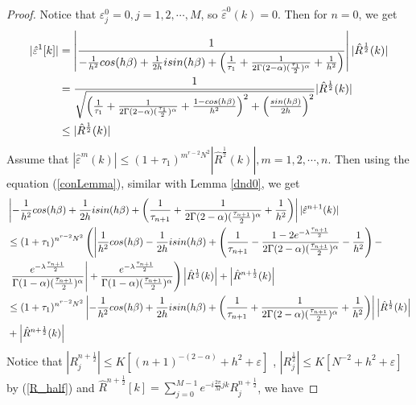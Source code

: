 \documentclass[10pt, reqno]{amsart}
\theoremstyle{remark}
\theoremstyle{definition}
\numberwithin{table}{section}
\begin{document}
\begin{proof}
    Notice that $\varepsilon^0_j=0, j=1, 2, \cdots, M$, so $\hat{\varepsilon}^0(k)=0$. Then for $n=0$, we get 
    \begin{align}
    |\hat{\varepsilon}^{1}[k]|&= \left|\frac{1}{-\frac{1}{h^2}cos(h\beta)+\frac{1}{2h}isin(h\beta)+\left(\frac{1}{\tau_{1}}+\frac{1}{2\Gamma(2-\alpha)(\frac{\tau_{1}}{2})^\alpha}+\frac{1}{h^2}\right)}\right||\hat{R}^{\frac{1}{2}}(k)|\notag\\
    &=\frac{1}{\sqrt{\left( \frac{1}{\tau_1}+\frac{1}{2\Gamma(2-\alpha)(\frac{\tau_{1}}{2})^\alpha}+\frac{1-cos(h\beta)}{h^2}\right)^2+\left(\frac{sin(h\beta)}{2h}\right)^2}}|\hat{R}^{\frac{1}{2}}(k)|\notag\\
    &\leq |\hat{R}^{\frac{1}{2}}(k)|\notag
\end{align}
Assume that $|\hat{\varepsilon}^m(k)|\leq (1+\tau_1)^{m^{r-2}N^{2}}|\hat{R}^{\frac{1}{2}}(k)|, m=1, 2, \cdots, n$. Then using the equation (\ref{conLemma}), similar with Lemma \ref{dnd0}, we get
\begin{align}
    &\left|-\frac{1}{h^2}cos(h\beta)+\frac{1}{2h}isin(h\beta)+\left(\frac{1}{\tau_{n+1}}+\frac{1}{2\Gamma(2-\alpha)(\frac{\tau_{n+1}}{2})^\alpha}+\frac{1}{h^2}\right) \right||\hat{\varepsilon}^{n+1}(k)|\notag \\
    &\leq (1+\tau_1)^{n^{r-2}N^{2}}\left(\left|\frac{1}{h^2}cos(h\beta)-\frac{1}{2h}isin(h\beta)+\left(\frac{1}{\tau_{n+1}}-\frac{1-2e^{-\lambda \frac{\tau_{n+1}}{2}}}{2\Gamma(2-\alpha)(\frac{\tau_{n+1}}{2})^\alpha}-\frac{1}{h^2}\right) -\right. \right. \notag\\
    &\left. \left. \frac{e^{-\lambda \frac{\tau_{n+1}}{2}}}{\Gamma(1-\alpha)(\frac{\tau_{n+1}}{2})^\alpha}\right|+\frac{e^{-\lambda \frac{\tau_{n+1}}{2}}}{\Gamma(1-\alpha)(\frac{\tau_{n+1}}{2})^\alpha}\right) \left|\hat{R}^{\frac{1}{2}}(k)\right|+\left|\hat{R}^{n+\frac{1}{2}}(k)\right| \notag\\
    &\leq (1+\tau_1)^{n^{r-2}N^{2}}\left|-\frac{1}{h^2}cos(h\beta)+\frac{1}{2h}isin(h\beta)+\left(\frac{1}{\tau_{n+1}}+\frac{1}{2\Gamma(2-\alpha)(\frac{\tau_{n+1}}{2})^\alpha}+\frac{1}{h^2}\right) \right|\left|\hat{R}^{\frac{1}{2}}(k)\right|\notag\\
    &+\left|\hat{R}^{n+\frac{1}{2}}(k)\right| \label{xi}
\end{align}
Notice that $\left|R_j^{n+\frac{1}{2}}\right| \leq K[(n+1)^{-(2-\alpha)}+h^2+\varepsilon]$ ,  $\left|R_j^{\frac{1}{2}}\right| \leq K[N^{-2}+h^2+\varepsilon]$ by (\ref{R_half}) and $\hat{R}^{n+\frac{1}{2}}[k]=\sum_{j=0}^{M-1} e^{-i \frac{2 \pi}{M} j k} R^{n+\frac{1}{2}}_j $, we have

\end{proof}
\end{document}

